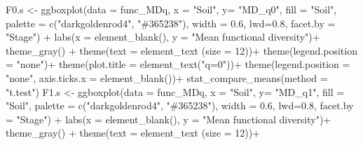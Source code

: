 \documentclass[]{interact}
\theoremstyle{plain}%
\theoremstyle{definition}
\theoremstyle{remark}
\newenvironment{Shaded}{\begin{snugshade}}{\end{snugshade}}
\newcommand{\AttributeTok}[1]{\textcolor[rgb]{0.77,0.63,0.00}{#1}}
\newcommand{\DecValTok}[1]{\textcolor[rgb]{0.00,0.00,0.81}{#1}}
\newcommand{\FloatTok}[1]{\textcolor[rgb]{0.00,0.00,0.81}{#1}}
\newcommand{\FunctionTok}[1]{\textcolor[rgb]{0.00,0.00,0.00}{#1}}
\newcommand{\NormalTok}[1]{#1}
\newcommand{\OtherTok}[1]{\textcolor[rgb]{0.56,0.35,0.01}{#1}}
\newcommand{\SpecialCharTok}[1]{\textcolor[rgb]{0.00,0.00,0.00}{#1}}
\newcommand{\StringTok}[1]{\textcolor[rgb]{0.31,0.60,0.02}{#1}}
\begin{document}
\begin{Shaded}
\begin{Highlighting}[]
\NormalTok{F0.s }\OtherTok{\textless{}{-}} \FunctionTok{ggboxplot}\NormalTok{(}\AttributeTok{data =}\NormalTok{ func\_MDq, }\AttributeTok{x =} \StringTok{"Soil"}\NormalTok{, }\AttributeTok{y=} \StringTok{"MD\_q0"}\NormalTok{,}
                  \AttributeTok{fill =} \StringTok{"Soil"}\NormalTok{, }\AttributeTok{palette =} \FunctionTok{c}\NormalTok{(}\StringTok{"darkgoldenrod4"}\NormalTok{, }\StringTok{"\#365238"}\NormalTok{), }
                  \AttributeTok{width =} \FloatTok{0.6}\NormalTok{, }\AttributeTok{lwd=}\FloatTok{0.8}\NormalTok{, }\AttributeTok{facet.by =} \StringTok{"Stage"}\NormalTok{)  }\SpecialCharTok{+}
  \FunctionTok{labs}\NormalTok{(}\AttributeTok{x =} \FunctionTok{element\_blank}\NormalTok{(), }\AttributeTok{y =} \StringTok{"Mean functional diversity"}\NormalTok{)}\SpecialCharTok{+}
  \FunctionTok{theme\_gray}\NormalTok{() }\SpecialCharTok{+}
  \FunctionTok{theme}\NormalTok{(}\AttributeTok{text =} \FunctionTok{element\_text}\NormalTok{ (}\AttributeTok{size =} \DecValTok{12}\NormalTok{))}\SpecialCharTok{+}
  \FunctionTok{theme}\NormalTok{(}\AttributeTok{legend.position =} \StringTok{"none"}\NormalTok{)}\SpecialCharTok{+}
  \FunctionTok{theme}\NormalTok{(}\AttributeTok{plot.title =} \FunctionTok{element\_text}\NormalTok{(}\StringTok{"q=0"}\NormalTok{))}\SpecialCharTok{+}
  \FunctionTok{theme}\NormalTok{(}\AttributeTok{legend.position =} \StringTok{"none"}\NormalTok{,}
        \AttributeTok{axis.ticks.x =} \FunctionTok{element\_blank}\NormalTok{())}\SpecialCharTok{+}
  \FunctionTok{stat\_compare\_means}\NormalTok{(}\AttributeTok{method =} \StringTok{"t.test"}\NormalTok{)}
\NormalTok{F1.s }\OtherTok{\textless{}{-}} \FunctionTok{ggboxplot}\NormalTok{(}\AttributeTok{data =}\NormalTok{ func\_MDq, }\AttributeTok{x =} \StringTok{"Soil"}\NormalTok{, }\AttributeTok{y=} \StringTok{"MD\_q1"}\NormalTok{,}
                  \AttributeTok{fill =} \StringTok{"Soil"}\NormalTok{, }\AttributeTok{palette =} \FunctionTok{c}\NormalTok{(}\StringTok{"darkgoldenrod4"}\NormalTok{, }\StringTok{"\#365238"}\NormalTok{), }
                  \AttributeTok{width =} \FloatTok{0.6}\NormalTok{, }\AttributeTok{lwd=}\FloatTok{0.8}\NormalTok{, }\AttributeTok{facet.by =} \StringTok{"Stage"}\NormalTok{)  }\SpecialCharTok{+}
  \FunctionTok{labs}\NormalTok{(}\AttributeTok{x =} \FunctionTok{element\_blank}\NormalTok{(), }\AttributeTok{y =} \StringTok{"Mean functional diversity"}\NormalTok{)}\SpecialCharTok{+}
  \FunctionTok{theme\_gray}\NormalTok{() }\SpecialCharTok{+}
  \FunctionTok{theme}\NormalTok{(}\AttributeTok{text =} \FunctionTok{element\_text}\NormalTok{ (}\AttributeTok{size =} \DecValTok{12}\NormalTok{))}\SpecialCharTok{+}

\end{Highlighting}
\end{Shaded}
\end{document}
